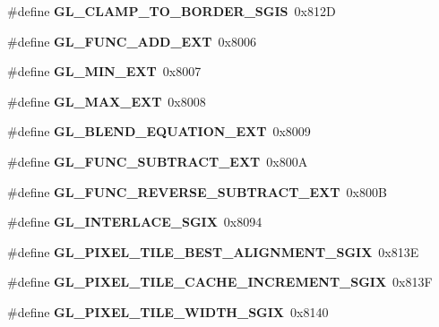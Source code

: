 \begin{DoxyCompactItemize}
\item 
\#define {\bfseries G\+L\+\_\+\+C\+L\+A\+M\+P\+\_\+\+T\+O\+\_\+\+B\+O\+R\+D\+E\+R\+\_\+\+S\+G\+I\+S}~0x812\+D\label{_s_d_l__opengl_8h_a1eb138a9f37352177296700349ab1334}

\item 
\#define {\bfseries G\+L\+\_\+\+F\+U\+N\+C\+\_\+\+A\+D\+D\+\_\+\+E\+X\+T}~0x8006\label{_s_d_l__opengl_8h_a8f043648e31e7f0b53ef160f159c9150}

\item 
\#define {\bfseries G\+L\+\_\+\+M\+I\+N\+\_\+\+E\+X\+T}~0x8007\label{_s_d_l__opengl_8h_a70f62d16502e28c2319711fd032320ea}

\item 
\#define {\bfseries G\+L\+\_\+\+M\+A\+X\+\_\+\+E\+X\+T}~0x8008\label{_s_d_l__opengl_8h_a21d769e684f6c26608a612ed04773515}

\item 
\#define {\bfseries G\+L\+\_\+\+B\+L\+E\+N\+D\+\_\+\+E\+Q\+U\+A\+T\+I\+O\+N\+\_\+\+E\+X\+T}~0x8009\label{_s_d_l__opengl_8h_aaa651ebba53e26be7f5b87e85104ef4e}

\item 
\#define {\bfseries G\+L\+\_\+\+F\+U\+N\+C\+\_\+\+S\+U\+B\+T\+R\+A\+C\+T\+\_\+\+E\+X\+T}~0x800\+A\label{_s_d_l__opengl_8h_aeaa01030ee3b2b3dedee9dcf46efbd44}

\item 
\#define {\bfseries G\+L\+\_\+\+F\+U\+N\+C\+\_\+\+R\+E\+V\+E\+R\+S\+E\+\_\+\+S\+U\+B\+T\+R\+A\+C\+T\+\_\+\+E\+X\+T}~0x800\+B\label{_s_d_l__opengl_8h_a46a02f13902cdf021bb59fdfab23b96e}

\item 
\#define {\bfseries G\+L\+\_\+\+I\+N\+T\+E\+R\+L\+A\+C\+E\+\_\+\+S\+G\+I\+X}~0x8094\label{_s_d_l__opengl_8h_aa384291e4d4e7cfcecaeb30bbc572f6b}

\item 
\#define {\bfseries G\+L\+\_\+\+P\+I\+X\+E\+L\+\_\+\+T\+I\+L\+E\+\_\+\+B\+E\+S\+T\+\_\+\+A\+L\+I\+G\+N\+M\+E\+N\+T\+\_\+\+S\+G\+I\+X}~0x813\+E\label{_s_d_l__opengl_8h_a8cc7fbbb542c06d24c40143847b6c0a9}

\item 
\#define {\bfseries G\+L\+\_\+\+P\+I\+X\+E\+L\+\_\+\+T\+I\+L\+E\+\_\+\+C\+A\+C\+H\+E\+\_\+\+I\+N\+C\+R\+E\+M\+E\+N\+T\+\_\+\+S\+G\+I\+X}~0x813\+F\label{_s_d_l__opengl_8h_ad73c2c30575135dcad99bdc02df30f1e}

\item 
\#define {\bfseries G\+L\+\_\+\+P\+I\+X\+E\+L\+\_\+\+T\+I\+L\+E\+\_\+\+W\+I\+D\+T\+H\+\_\+\+S\+G\+I\+X}~0x8140\label{_s_d_l__opengl_8h_ac1a9f198f6a2c9bbad4597429a7f5143}


\end{DoxyCompactItemize}

